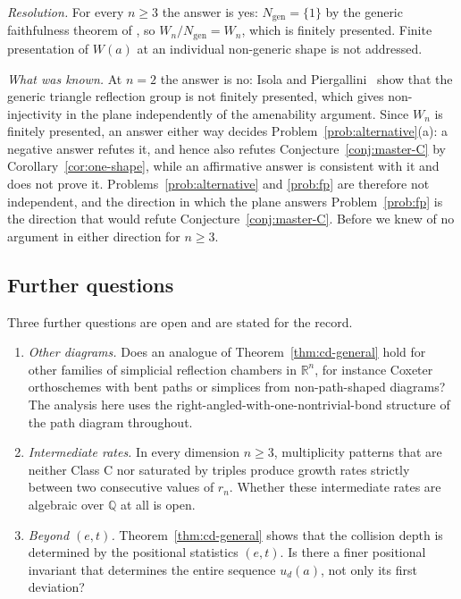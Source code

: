\documentclass[11pt,a4paper]{article}
\newcommand{\R}{\mathbb{R}}
\newcommand{\Q}{\mathbb{Q}}
\theoremstyle{definition}
\theoremstyle{remark}
\theoremstyle{plain}
\begin{document}
\emph{Resolution.} For every $n\ge3$ the answer is yes: $N_{\mathrm{gen}}=\{1\}$ by the generic
faithfulness theorem of \cite{Bonfioli3}, so $W_n/N_{\mathrm{gen}}=W_n$, which is finitely presented.
Finite presentation of $W(a)$ at an individual non-generic shape is not addressed.

\emph{What was known.} At $n=2$ the answer is no: Isola and Piergallini~\cite{isola-piergallini}
show that the generic triangle reflection group is not finitely presented, which gives
non-injectivity in the plane independently of the amenability argument. Since $W_n$ is finitely
presented, an answer either way decides Problem~\ref{prob:alternative}(a): a negative answer
refutes it, and hence also refutes Conjecture~\ref{conj:master-C} by
Corollary~\ref{cor:one-shape}, while an affirmative answer is consistent with it and does not
prove it. Problems~\ref{prob:alternative} and \ref{prob:fp} are therefore not independent, and
the direction in which the plane answers Problem~\ref{prob:fp} is the direction that would
refute Conjecture~\ref{conj:master-C}. Before \cite{Bonfioli3} we knew of no argument in either
direction for $n\ge3$.

\subsection{Further questions}

Three further questions are open and are stated for the record.

\begin{enumerate}[label=(Q\arabic*),leftmargin=2.6em,itemsep=0.35em]
\item \emph{Other diagrams.} Does an analogue of Theorem~\ref{thm:cd-general} hold for other
families of simplicial reflection chambers in $\R^n$, for instance Coxeter orthoschemes with
bent paths or simplices from non-path-shaped diagrams? The analysis here uses the
right-angled-with-one-nontrivial-bond structure of the path diagram throughout.

\item \emph{Intermediate rates.} In every dimension $n\ge3$, multiplicity patterns that are
neither Class C nor saturated by triples produce growth rates strictly between two consecutive
values of $r_n$. Whether these intermediate rates are algebraic over $\Q$ at all is open.

\item \emph{Beyond $(e,t)$.} Theorem~\ref{thm:cd-general} shows that the collision depth is
determined by the positional statistics $(e,t)$. Is there a finer positional invariant that
determines the entire sequence $u_d(a)$, not only its first deviation?
\end{enumerate}
\end{document}
